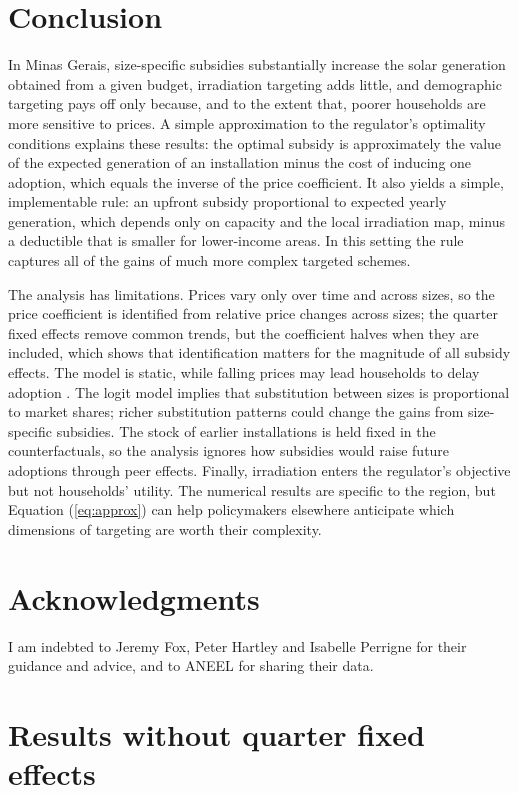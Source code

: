 \documentclass[final,3p,times,authoryear]{elsarticle}
\begin{document}
\section{Conclusion}
\label{Conclusion}

    In Minas Gerais, size-specific subsidies substantially increase the solar generation obtained from a given budget, irradiation targeting adds little, and demographic targeting pays off only because, and to the extent that, poorer households are more sensitive to prices. A simple approximation to the regulator's optimality conditions explains these results: the optimal subsidy is approximately the value of the expected generation of an installation minus the cost of inducing one adoption, which equals the inverse of the price coefficient. It also yields a simple, implementable rule: an upfront subsidy proportional to expected yearly generation, which depends only on capacity and the local irradiation map, minus a deductible that is smaller for lower-income areas. In this setting the rule captures all of the gains of much more complex targeted schemes.

    The analysis has limitations. Prices vary only over time and across sizes, so the price coefficient is identified from relative price changes across sizes; the quarter fixed effects remove common trends, but the coefficient halves when they are included, which shows that identification matters for the magnitude of all subsidy effects. The model is static, while falling prices may lead households to delay adoption \citep{dgv2019pv_discountfactor, burr2020pv_subsidies}. The logit model implies that substitution between sizes is proportional to market shares; richer substitution patterns could change the gains from size-specific subsidies. The stock of earlier installations is held fixed in the counterfactuals, so the analysis ignores how subsidies would raise future adoptions through peer effects. Finally, irradiation enters the regulator's objective but not households' utility. The numerical results are specific to the region, but Equation (\ref{eq:approx}) can help policymakers elsewhere anticipate which dimensions of targeting are worth their complexity.

\section*{Acknowledgments}

I am indebted to Jeremy Fox, Peter Hartley and Isabelle Perrigne for their guidance and advice, and to ANEEL for sharing their data.

\appendix
\section{Results without quarter fixed effects}

    



\end{document}
